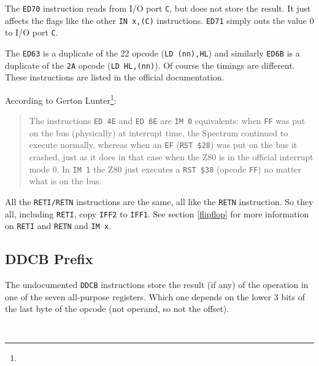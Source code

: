 The {\tt ED70} instruction reads from I/O port {\tt C}, but does not store the result. It just affects the flags like the other {\tt IN x,(C)} instructions. {\tt ED71} simply outs the value 0 to I/O port {\tt C}.

The {\tt ED63} is a duplicate of the 22 opcode ({\tt LD (nn),HL}) and similarly {\tt ED6B} is a duplicate of the {\tt 2A} opcode ({\tt LD HL,(nn)}). Of course the timings are different. These instructions are listed in the official documentation.

According to Gerton Lunter\footnote{}:

\begin{quote}
	The instructions {\tt ED 4E} and {\tt ED 6E} are {\tt IM 0} equivalents: when {\tt FF} was put on the bus (physically) at interrupt time, the Spectrum continued to execute normally, whereas when an {\tt EF} ({\tt RST \$28}) was put on the bus it crashed, just as it does in that case when the Z80 is in the official interrupt mode 0. In {\tt IM 1} the Z80 just executes a {\tt RST \$38} (opcode {\tt FF}) no matter what is on the bus.
\end{quote}

All the {\tt RETI/RETN} instructions are the same, all like the {\tt RETN} instruction. So they all, including {\tt RETI}, copy {\tt IFF2} to {\tt IFF1}. See section \ref{flipflop} for more information on {\tt RETI} and {\tt RETN} and {\tt IM x}.


\subsection{DDCB Prefix}
\label{prefix_cbdd}

The undocumented {\tt DDCB} instructions store the result (if any) of the operation in one of the seven all-purpose registers. Which one depends on the lower 3 bits of the last byte of the opcode (not operand, so not the offset).

{\tt
	\vspace*{1em}

	\begin{parcolumns}[colwidths={1=0.3\linewidth}]{2}
	\end{parcolumns}
}


